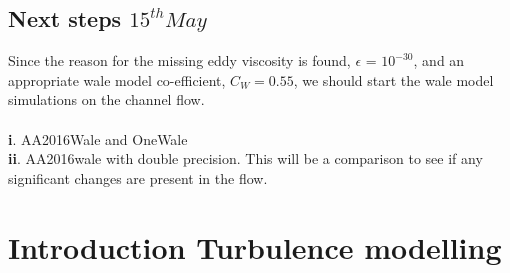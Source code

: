 \documentclass[a4paper]{article}
\begin{document}
\subsection{Next steps $15^{th} May$}

Since the reason for the missing eddy viscosity is found, $\epsilon$ = $10^{-30}$, and an appropriate wale model co-efficient, $C_{W} = 0.55$, we should start the wale model simulations on the channel flow.
\\
\\
{\bf i}. AA2016Wale and OneWale\\
{\bf ii}. AA2016wale with double precision. This will be a comparison to see if any significant changes are present in the flow. 


\newpage

\section{Introduction Turbulence modelling}
\end{document}
